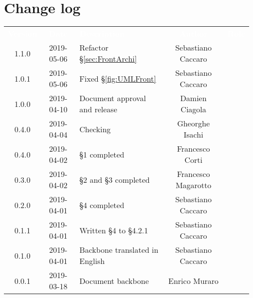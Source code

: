 \section*{Change log}
{
	\renewcommand{\arraystretch}{1.5}
	\centering
	\begin{longtable}{ c c C{6cm} c c }
		\textcolor{white}{\textbf{Version}} & \textcolor{white}{\textbf{Date}} & \textcolor{white}{\textbf{Description}} & \textcolor{white}{\textbf{Author}} & \textcolor{white}{\textbf{Role}}\\
		1.1.0 & 2019-05-06 & Refactor §\ref{sec:FrontArchi} & Sebastiano Caccaro & \reda{}\\
		1.0.1 & 2019-05-06 & Fixed §\ref{fig:UMLFront} & Sebastiano Caccaro & \reda{}\\
		1.0.0 & 2019-04-10 & Document approval and release & Damien Ciagola & \RdP{}\\
		0.4.0 & 2019-04-04 & Checking & Gheorghe Isachi & \ver{}\\
		0.4.0 & 2019-04-02 & §1 completed  & Francesco Corti & \reda{}\\		
		0.3.0 & 2019-04-02 & §2 and §3 completed  & Francesco Magarotto & \reda{}\\				
		0.2.0 & 2019-04-01 & §4 completed  & Sebastiano Caccaro & \reda{}\\
		0.1.1 & 2019-04-01 & Written §4 to §4.2.1  & Sebastiano Caccaro & \reda{}\\
		0.1.0 & 2019-04-01 & Backbone translated in English & Sebastiano Caccaro & \reda{}\\
		0.0.1 & 2019-03-18 & Document backbone & Enrico Muraro & \reda{}\\
		
	\end{longtable}

}

